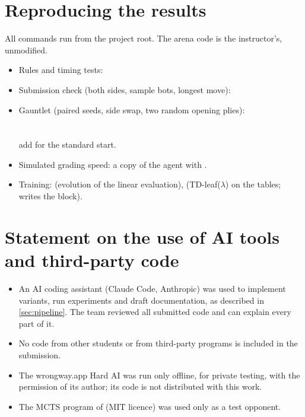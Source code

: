 \section{Reproducing the results}
\label{app:repro}
All commands run from the project root. The arena code is the instructor's, unmodified.
\begin{itemize}
  \item Rules and timing tests: 
  \item Submission check (both sides, sample bots, longest move):\\
  \item Gauntlet (paired seeds, side swap, two random opening plies):\\
        \\
        \\
        add  for the standard start.
  \item Simulated grading speed: a copy of the agent with .
  \item Training:  (evolution of the linear evaluation),
         (TD-leaf($\lambda$) on the tables; writes the
         block).
\end{itemize}

\section{Statement on the use of AI tools and third-party code}
\begin{itemize}
  \item An AI coding assistant (Claude Code, Anthropic) was used to implement variants, run
        experiments and draft documentation, as described in \cref{sec:pipeline}. The team
        reviewed all submitted code and can explain every part of it.
  \item No code from other students or from third-party programs is included in the
        submission.
  \item The wrongway.app Hard AI was run only offline, for private testing, with the permission
        of its author; its code is not distributed with this work.
  \item The MCTS program of \citet{gorisanson} (MIT licence) was used only as a test opponent.
\end{itemize}

